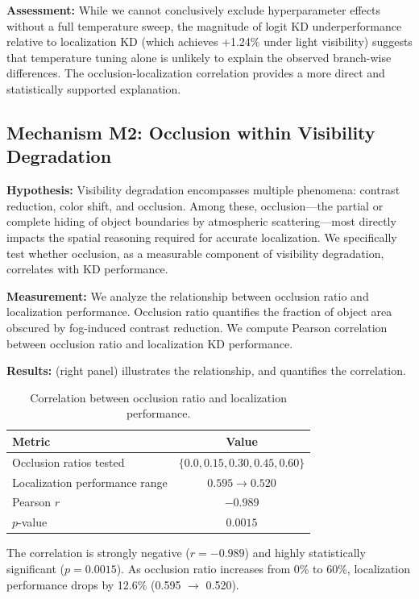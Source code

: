 \textbf{Assessment:} While we cannot conclusively exclude hyperparameter effects without a full temperature sweep, the magnitude of logit KD underperformance relative to localization KD (which achieves +1.24\% under light visibility) suggests that temperature tuning alone is unlikely to explain the observed branch-wise differences. The occlusion-localization correlation provides a more direct and statistically supported explanation.

\subsection{Mechanism M2: Occlusion within Visibility Degradation}

\textbf{Hypothesis:} Visibility degradation encompasses multiple phenomena: contrast reduction, color shift, and occlusion. Among these, occlusion---the partial or complete hiding of object boundaries by atmospheric scattering---most directly impacts the spatial reasoning required for accurate localization. We specifically test whether occlusion, as a measurable component of visibility degradation, correlates with KD performance.

\textbf{Measurement:} We analyze the relationship between occlusion ratio and localization performance. Occlusion ratio quantifies the fraction of object area obscured by fog-induced contrast reduction. We compute Pearson correlation between occlusion ratio and localization KD performance.

\textbf{Results:}  (right panel) illustrates the relationship, and  quantifies the correlation.

\begin{table}[htbp]
\centering
\caption{Correlation between occlusion ratio and localization performance.}
\label{tab:occlusion_corr}
\begin{tabular}{@{}lc@{}}
\toprule
Metric & Value \\
\midrule
Occlusion ratios tested & $\{0.0, 0.15, 0.30, 0.45, 0.60\}$ \\
Localization performance range & $0.595 \to 0.520$ \\
Pearson $r$ & $\mathbf{-0.989}$ \\
$p$-value & $\mathbf{0.0015}$ \\
\bottomrule
\end{tabular}
\end{table}

The correlation is strongly negative ($r = -0.989$) and highly statistically significant ($p = 0.0015$). As occlusion ratio increases from 0\% to 60\%, localization performance drops by 12.6\% (0.595 $\to$ 0.520).

